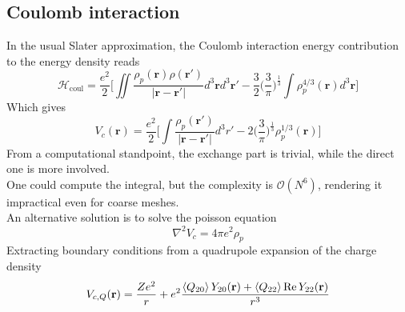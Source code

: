 \subsection{Coulomb interaction}
In the usual Slater approximation, the Coulomb interaction energy contribution to the energy density reads
\begin{equation}
    \mathcal H_\text{coul} = \frac{e^2}{2}\bigg[\iint  \frac{\rho_p(\mathbf r )\rho(\mathbf r ' )}{|\mathbf r-\mathbf r'|}d^3\mathbf r d^3\mathbf r' - \frac 3 2 \bigg(\frac 3 \pi \bigg) ^{\frac 1 3}\int \rho_p^{4/3}(\mathbf r)d^3\mathbf r\bigg]
\end{equation}
Which gives
\begin{equation}
    V_c(\mathbf r) = \frac{e^2}{2}\bigg[\int \frac{\rho_p(\mathbf r ')}{|\mathbf r-\mathbf r'|} d^3 r' - 2\bigg(\frac 3 \pi \bigg) ^{\frac 1 3} \rho_p^{1/3}(\mathbf r ) \bigg]
\end{equation}
From a computational standpoint, the exchange part is trivial, while the direct one is more involved.
\\One could compute the integral, but the complexity is $\mathcal O(N^6)$, rendering it impractical even for coarse meshes.
\\An alternative solution is to solve the poisson equation
\begin{equation}
    \nabla^2 V_c = 4\pi e^2 \rho_p
\end{equation}
Extracting boundary conditions from a quadrupole expansion of the charge density
\begin{equation}
    V_{c, Q}(\mathbf r ) = \frac{Ze^2}{r} + e^2\frac{\expval{Q_{20}} Y_{20}(\mathbf r) + \expval{Q_{22}}\Re Y_{22}(\mathbf r)}{{r}^3}
\end{equation}
